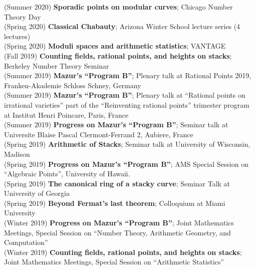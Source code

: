 \documentclass[margin,line]{res}
\begin{document}
\begin{resume}
(Summer 2020) \textbf{Sporadic points on modular curves};
Chicago Number Theory Day 
\vspace{.05cm}\\
(Spring 2020) \textbf{Classical Chabauty};
Arizona Winter School lecture series (4 lectures)
\vspace{.05cm}\\
(Spring 2020) \textbf{Moduli spaces and arithmetic statistics};
VANTAGE
\vspace{.05cm}\\
(Fall 2019) \textbf{Counting fields, rational points, and heights on stacks};
Berkeley Number Theory Seminar
\vspace{.05cm}\\
(Summer 2019) \textbf{Mazur's ``Program B''};  
Plenary talk at Rational Points 2019, Franken-Akademie Schloss Schney, Germany
\vspace{.05cm}\\
(Summer 2019) \textbf{Mazur's ``Program B''};  
Plenary talk at ``Rational points on irrational varieties'' part of the  ``Reinventing rational points'' trimester program at Institut Henri Poincare, Paris, France
\\
(Summer 2019) \textbf{Progress on Mazur's ``Program B''};  
Seminar talk at Universite Blaise Pascal Clermont-Ferrand 2, Aubiere, France
\vspace{.05cm}\\
(Spring 2019) \textbf{Arithmetic of Stacks};  
Seminar talk at  University of Wisconsin, Madison
\vspace{.05cm}\\
(Spring 2019) \textbf{Progress on Mazur's ``Program B''};  
AMS Special Session on ``Algebraic Points'', University of Hawaii.
\vspace{.05cm}\\
(Spring 2019) \textbf{The canonical ring of a stacky curve};  
Seminar Talk at University of Georgia
\vspace{.05cm}\\
(Spring 2019) \textbf{Beyond Fermat's last theorem};
Colloquium at Miami University 
\vspace{.05cm}\\
(Winter 2019) \textbf{Progress on Mazur's ``Program B''};  
Joint Mathematics Meetings, Special Session on ``Number Theory, Arithmetic Geometry, and Computation''
\vspace{.05cm}\\
(Winter 2019) \textbf{Counting fields, rational points, and heights on stacks};
Joint Mathematics Meetings, Special Session on ``Arithmetic Statistics''

\end{resume}
\end{document}
